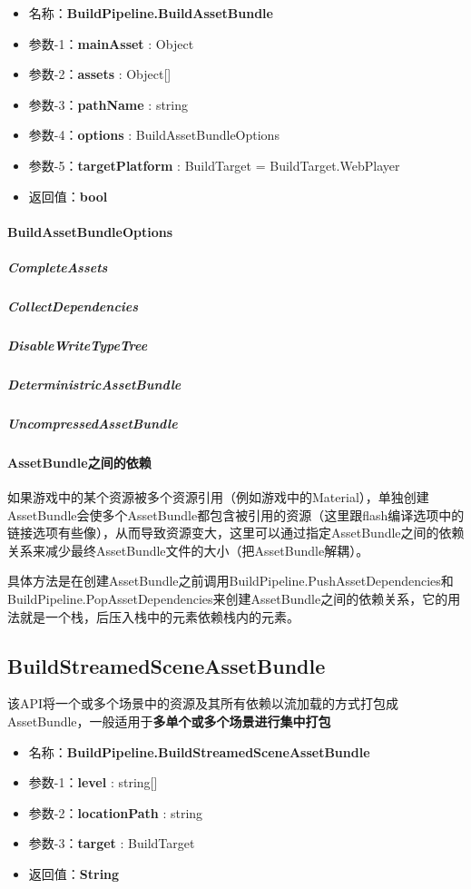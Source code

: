 \documentclass[UTF8,a4paper,12pt]{ctexbook}
\begin{document}
			\begin{itemize}
				\item 名称：\textbf{BuildPipeline.BuildAssetBundle}
				\item 参数-1：\textbf{mainAsset} : Object
				\item 参数-2：\textbf{assets} : Object[]
				\item 参数-3：\textbf{pathName} : string
				\item 参数-4：\textbf{options} : BuildAssetBundleOptions
				\item 参数-5：\textbf{targetPlatform} : BuildTarget = BuildTarget.WebPlayer
				\item 返回值：\textbf{bool}
			\end{itemize}
			
			\paragraph{BuildAssetBundleOptions}
				\subparagraph{CompleteAssets}
				
				\subparagraph{CollectDependencies}
				
				\subparagraph{DisableWriteTypeTree}
				
				\subparagraph{DeterministricAssetBundle}
				
				\subparagraph{UncompressedAssetBundle}

			\paragraph{AssetBundle之间的依赖}	
				如果游戏中的某个资源被多个资源引用（例如游戏中的Material），单独创建AssetBundle会使多个AssetBundle都包含被引用的资源（这里跟flash编译选项中的链接选项有些像），从而导致资源变大，这里可以通过指定AssetBundle之间的依赖关系来减少最终AssetBundle文件的大小（把AssetBundle解耦）。
				
				具体方法是在创建AssetBundle之前调用BuildPipeline.PushAssetDependencies和BuildPipeline.PopAssetDependencies来创建AssetBundle之间的依赖关系，它的用法就是一个栈，后压入栈中的元素依赖栈内的元素。
			
		\subsection{BuildStreamedSceneAssetBundle}
			该API将一个或多个场景中的资源及其所有依赖以流加载的方式打包成AssetBundle，一般适用于\textbf{多单个或多个场景进行集中打包}
			
			\begin{itemize}
				\item 名称：\textbf{BuildPipeline.BuildStreamedSceneAssetBundle}
				\item 参数-1：\textbf{level} : string[]
				\item 参数-2：\textbf{locationPath} : string
				\item 参数-3：\textbf{target} : BuildTarget
				\item 返回值：\textbf{String}
			\end{itemize}
\end{document}
